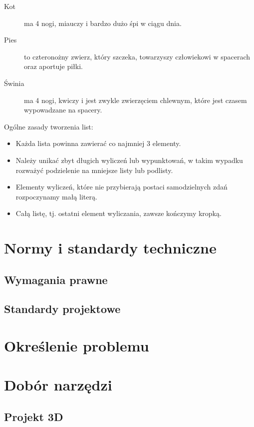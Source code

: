 \begin{description}
    \item[Kot] ma 4 nogi, miauczy i bardzo dużo śpi w ciągu dnia.
    \item[Pies] to czteronożny zwierz, który szczeka, towarzyszy człowiekowi w 
   spacerach oraz aportuje piłki.
    \item[Świnia] ma 4 nogi, kwiczy i jest zwykle zwierzęciem chlewnym, które jest 
   czasem wypowadzane na spacery.
\end{description}
\noindent Ogólne zasady tworzenia list:
\begin{itemize}
    \item Każda lista powinna zawierać co najmniej 3 elementy.
    \item Należy unikać zbyt długich wyliczeń lub wypunktowań, w takim wypadku rozważyć podzielenie 
    na mniejsze listy lub podlisty.
    \item Elementy wyliczeń, które nie przybierają postaci samodzielnych zdań rozpoczynamy małą literą.
    \item Całą listę, tj. ostatni element wyliczania, zawsze kończymy kropką.
\end{itemize}


\clearpage\chapter{Normy i standardy techniczne}
\noindent \lipsum[1-3]

    \section{Wymagania prawne}
    \noindent \lipsum[4-5]

    \section{Standardy projektowe}
    \noindent \lipsum[6-7]

\clearpage\chapter{Określenie problemu}
    \noindent \lipsum[8-9]

\clearpage\chapter{Dobór narzędzi}
    \noindent \lipsum[1-3]

    \section{Projekt 3D}
        \noindent \lipsum[4-5]

